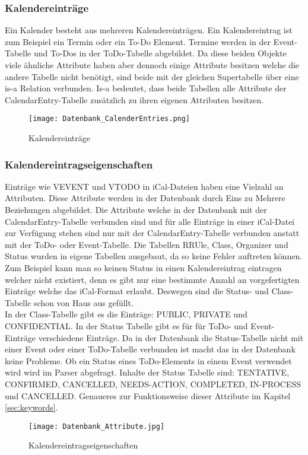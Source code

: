 \subsubsection*{Kalendereinträge}
\label{ref:kalenderEintraege}
Ein Kalender besteht aus mehreren Kalendereinträgen. Ein Kalendereintrag ist zum Beispiel ein Termin oder ein To-Do Element. Termine werden in der Event-Tabelle und To-Dos in der ToDo-Tabelle abgebildet. Da diese beiden Objekte viele ähnliche Attribute haben aber dennoch einige Attribute besitzen welche die andere Tabelle nicht benötigt, sind beide mit der gleichen Supertabelle über eine is-a Relation verbunden. Is-a bedeutet, dass beide Tabellen alle Attribute der CalendarEntry-Tabelle zusätzlich zu ihren eigenen Attributen besitzen.
\begin{figure}[H]
	\texttt{[image: Datenbank\_CalenderEntries.png]}
    \caption{Kalendereinträge}
    \label{fig:calendarEntries}
\end{figure}

\subsubsection*{Kalendereintragseigenschaften}
\label{ref:kalendereintragseigenschaften}
Einträge wie VEVENT und VTODO in iCal-Dateien haben eine Vielzahl an Attributen. Diese Attribute werden in der Datenbank durch Eins zu Mehrere Beziehungen abgebildet. Die Attribute welche in der Datenbank mit der CalendarEntry-Tabelle verbunden sind und für alle Einträge in einer iCal-Datei zur Verfügung stehen sind nur mit der CalendarEntry-Tabelle verbunden anstatt mit der ToDo- oder Event-Tabelle. Die Tabellen RRUle, Class, Organizer und Status wurden in eigene Tabellen ausgebaut, da so keine Fehler auftreten können. Zum Beispiel kann man so keinen Status in einen Kalendereintrag eintragen welcher nicht existiert, denn es gibt nur eine bestimmte Anzahl an vorgefertigten Einträge welche das iCal-Format erlaubt. Deswegen sind die Status- und Class-Tabelle schon von Haus aus gefüllt.\\
In der Class-Tabelle gibt es die Einträge: PUBLIC, PRIVATE und CONFIDENTIAL. In der Status Tabelle gibt es für für ToDo- und Event-Einträge verschiedene Einträge. Da in der Datenbank die Status-Tabelle nicht mit einer Event oder einer ToDo-Tabelle verbunden ist macht das in der Datenbank keine Probleme. Ob ein Status eines ToDo-Elements in einem Event verwendet wird wird im Parser abgefragt. Inhalte der Status Tabelle sind: TENTATIVE, CONFIRMED, CANCELLED, NEEDS-ACTION, COMPLETED, IN-PROCESS und CANCELLED. Genaueres zur Funktionsweise dieser Attribute im Kapitel \ref{sec:keywords}.
\begin{figure}[H]
	\texttt{[image: Datenbank\_Attribute.jpg]}
    \caption{Kalendereintragseigenschaften}
    \label{fig:kalendereintragseigenschaften}
\end{figure}

